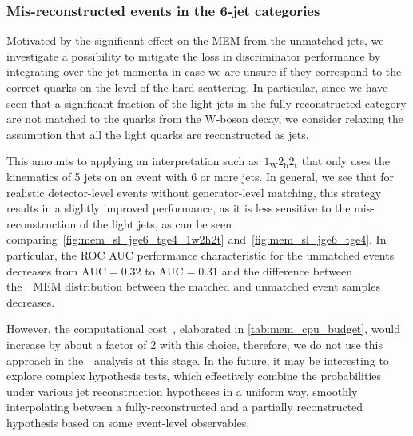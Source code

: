 \subsubsection{Mis-reconstructed events in the 6-jet categories}
Motivated by the significant effect on the MEM from the unmatched jets, we investigate a possibility to mitigate the loss in discriminator performance by integrating over the jet momenta in case we are unsure if they correspond to the correct quarks on the level of the hard scattering. In particular, since we have seen that a significant fraction of the light jets in the fully-reconstructed category are not matched to the quarks from the W-boson decay, we consider relaxing the assumption that all the light quarks are reconstructed as jets.

This amounts to applying an interpretation such as~$1_{\mathrm{W}} 2_{\mathrm{h}} 2_{\mathrm{t}}$ that only uses the kinematics of 5 jets on an event with 6 or more jets. In general, we see that for realistic detector-level events without generator-level matching, this strategy results in a slightly improved performance, as it is less sensitive to the mis-reconstruction of the light jets, as can be seen comparing~\cref{fig:mem_sl_jge6_tge4_1w2h2t} and~\cref{fig:mem_sl_jge6_tge4}. In particular, the ROC AUC performance characteristic for the unmatched events decreases from $\mathrm{AUC} = 0.32$ to $\mathrm{AUC} = 0.31$ and the difference between the~\ttHbb~MEM distribution between the matched and unmatched event samples decreases.

However, the computational cost~, elaborated in \cref{tab:mem_cpu_budget}, would increase by about a factor of 2 with this choice, therefore, we do not use this approach in the~\ttHbb~analysis at this stage. In the future, it may be interesting to explore complex hypothesis tests, which effectively combine the probabilities under various jet reconstruction hypotheses in a uniform way, smoothly interpolating between a fully-reconstructed and a partially reconstructed hypothesis based on some event-level observables.

